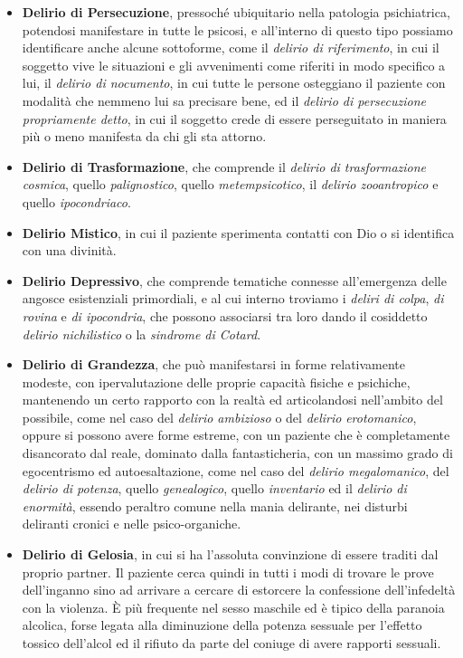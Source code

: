 \begin{itemize}
\item
  \textbf{Delirio di Persecuzione}, pressoché ubiquitario nella
  patologia psichiatrica, potendosi manifestare in tutte le psicosi, e
  all'interno di questo tipo possiamo identificare anche alcune
  sottoforme, come il \emph{delirio di riferimento}, in cui il soggetto
  vive le situazioni e gli avvenimenti come riferiti in modo specifico a
  lui, il \emph{delirio di nocumento}, in cui tutte le persone
  osteggiano il paziente con modalità che nemmeno lui sa precisare bene,
  ed il \emph{delirio di persecuzione propriamente detto}, in cui il
  soggetto crede di essere perseguitato in maniera più o meno manifesta
  da chi gli sta attorno.
\item
  \textbf{Delirio di Trasformazione}, che comprende il \emph{delirio di
  trasformazione cosmica}, quello \emph{palignostico}, quello
  \emph{metempsicotico}, il \emph{delirio zooantropico} e quello
  \emph{ipocondriaco}.
\item
  \textbf{Delirio Mistico}, in cui il paziente sperimenta contatti con
  Dio o si identifica con una divinità.
\item
  \textbf{Delirio Depressivo}, che comprende tematiche connesse
  all'emergenza delle angosce esistenziali primordiali, e al cui interno
  troviamo i \emph{deliri di colpa}, \emph{di rovina} e \emph{di
  ipocondria}, che possono associarsi tra loro dando il cosiddetto
  \emph{delirio nichilistico} o la \emph{sindrome di Cotard}.
\item
  \textbf{Delirio di Grandezza}, che può manifestarsi in forme
  relativamente modeste, con ipervalutazione delle proprie capacità
  fisiche e psichiche, mantenendo un certo rapporto con la realtà ed
  articolandosi nell'ambito del possibile, come nel caso del
  \emph{delirio ambizioso} o del \emph{delirio} \emph{erotomanico},
  oppure si possono avere forme estreme, con un paziente che è
  completamente disancorato dal reale, dominato dalla fantasticheria,
  con un massimo grado di egocentrismo ed autoesaltazione, come nel caso
  del \emph{delirio megalomanico}, del \emph{delirio di potenza}, quello
  \emph{genealogico}, quello \emph{inventario} ed il \emph{delirio di
  enormità}, essendo peraltro comune nella mania delirante, nei disturbi
  deliranti cronici e nelle psico-organiche.
\item
  \textbf{Delirio di Gelosia}, in cui si ha l'assoluta convinzione di
  essere traditi dal proprio partner. Il paziente cerca quindi in tutti
  i modi di trovare le prove dell'inganno sino ad arrivare a cercare di
  estorcere la confessione dell'infedeltà con la violenza. È più
  frequente nel sesso maschile ed è tipico della paranoia alcolica,
  forse legata alla diminuzione della potenza sessuale per l'effetto
  tossico dell'alcol ed il rifiuto da parte del coniuge di avere
  rapporti sessuali.
\end{itemize}


